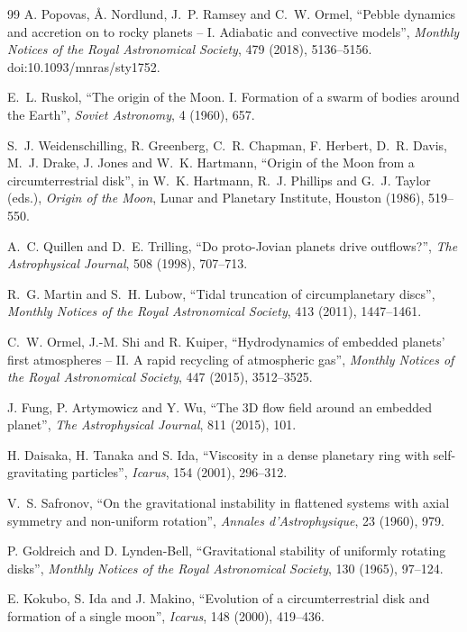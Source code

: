 \documentclass[11pt,a4paper,openany]{report}
\begin{document}
\begin{thebibliography}{99}
 A. Popovas, Å. Nordlund, J.~P. Ramsey and C.~W. Ormel, ``Pebble dynamics and
accretion on to rocky planets -- I. Adiabatic and convective models'', \emph{Monthly Notices of the
Royal Astronomical Society}, 479 (2018), 5136--5156. doi:10.1093/mnras/sty1752.

 E.~L. Ruskol, ``The origin of the Moon. I. Formation of a swarm of bodies
around the Earth'', \emph{Soviet Astronomy}, 4 (1960), 657.

 S.~J. Weidenschilling, R. Greenberg, C.~R. Chapman, F. Herbert,
D.~R. Davis, M.~J. Drake, J. Jones and W.~K. Hartmann, ``Origin of the Moon from a circumterrestrial
disk'', in W.~K. Hartmann, R.~J. Phillips and G.~J. Taylor (eds.), \emph{Origin of the Moon}, Lunar
and Planetary Institute, Houston (1986), 519--550.

 A.~C. Quillen and D.~E. Trilling, ``Do proto-Jovian planets drive
outflows?'', \emph{The Astrophysical Journal}, 508 (1998), 707--713.

 R.~G. Martin and S.~H. Lubow, ``Tidal truncation of circumplanetary
discs'', \emph{Monthly Notices of the Royal Astronomical Society}, 413 (2011), 1447--1461.

 C.~W. Ormel, J.-M. Shi and R. Kuiper, ``Hydrodynamics of embedded planets' first
atmospheres -- II. A rapid recycling of atmospheric gas'', \emph{Monthly Notices of the Royal
Astronomical Society}, 447 (2015), 3512--3525.

 J. Fung, P. Artymowicz and Y. Wu, ``The 3D flow field around an embedded
planet'', \emph{The Astrophysical Journal}, 811 (2015), 101.

 H. Daisaka, H. Tanaka and S. Ida, ``Viscosity in a dense planetary ring with
self-gravitating particles'', \emph{Icarus}, 154 (2001), 296--312.

 V.~S. Safronov, ``On the gravitational instability in flattened systems with
axial symmetry and non-uniform rotation'', \emph{Annales d'Astrophysique}, 23 (1960), 979.

 P. Goldreich and D. Lynden-Bell, ``Gravitational stability of
uniformly rotating disks'', \emph{Monthly Notices of the Royal Astronomical Society}, 130 (1965),
97--124.

 E. Kokubo, S. Ida and J. Makino, ``Evolution of a circumterrestrial disk and
formation of a single moon'', \emph{Icarus}, 148 (2000), 419--436.


\end{thebibliography}
\end{document}
